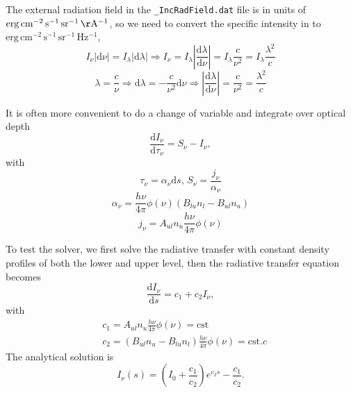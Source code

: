 \documentclass[12pt,a4paper]{article}
\newcommand{\mr}{\mathrm}
\newcommand{\fird}[2][]{\frac{\mathrm{d}#1}{\mathrm{d}#2}}
\newcommand{\dd}[1]{\mathrm{d}#1}
\begin{document}
The external radiation field in the \texttt{_IncRadField.dat} file is in units of $\mr{erg\,cm^{-2}\,s^{-1}\,sr^{-1}\,\AA^{-1}}$, so we need to convert the specific intensity in to $\mr{erg\,cm^{-2}\,s^{-1}\,sr^{-1}\,Hz^{-1}}$,
\begin{equation}
    I_\nu |\dd{\nu}| = I_\lambda |\dd{\lambda}|  \Rightarrow I_\nu = I_\lambda \left|\frac{\dd{\lambda}}{\dd{\nu}}\right| = I_\lambda \frac{c}{\nu^2} = I_\lambda \frac{\lambda^2}{c}
\end{equation}
\begin{equation}
    \lambda = \frac{c}{\nu} \Rightarrow \dd{\lambda} = -\frac{c}{\nu^2}\dd{\nu} \Rightarrow \left|\frac{\dd{\lambda}}{\dd{\nu}}\right| = \frac{c}{\nu^2} = \frac{\lambda^2}{c}
\end{equation}


It is often more convenient to do a change of variable and integrate over optical depth
\begin{equation}
    \fird[I_\nu]{\tau_\nu} = S_\nu - I_\nu,
\end{equation}
with 
\begin{equation}
    \tau_\nu = \alpha_\nu \dd{s},\,S_\nu = \frac{j_\nu}{\alpha_\nu}
\end{equation}
\begin{equation}
     \alpha_\nu = \frac{h\nu}{4\pi} \phi(\nu)(B_{lu}n_l - B_{ul} n_u)
\end{equation}
\begin{equation}
    j_\nu = A_{ul} n_u \frac{h\nu}{4\pi} \phi(\nu)
\end{equation}

To test the solver, we first solve the radiative transfer with constant density profiles of both the lower and upper level, then the radiative transfer equation becomes
\begin{equation}
    \fird[I_\nu]{s} = c_1  + c_2 I_\nu, \label{eq:simple_rte}
\end{equation} 
with 
\begin{align*}
    &c_1 = A_{ul} n_u \frac{h\nu}{4\pi} \phi(\nu) = \mr{cst}\\
    &c_2 = \left(B_{ul} n_u - B_{lu} n_l\right) \frac{h\nu}{4\pi} \phi(\nu) = \mr{cst}.c
\end{align*}
The analytical solution is 
\begin{equation}
    I_\nu (s) = (I_0 + \frac{c_1}{c_2})e^{c_2s} - \frac{c_1}{c_2}.
\end{equation}
\end{document}
